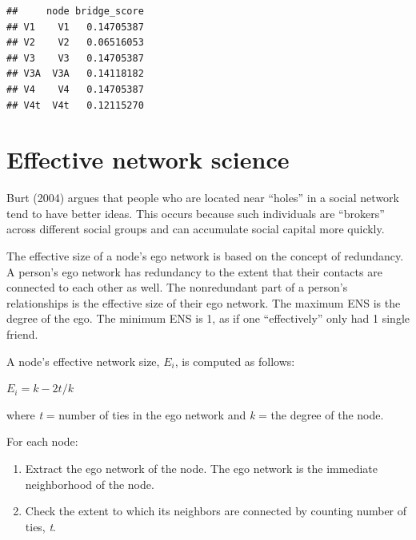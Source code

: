 \documentclass[
]{book}
\newenvironment{Shaded}{\begin{snugshade}}{\end{snugshade}}
\newcommand{\AttributeTok}[1]{\textcolor[rgb]{0.13,0.29,0.53}{#1}}
\newcommand{\FunctionTok}[1]{\textcolor[rgb]{0.13,0.29,0.53}{\textbf{#1}}}
\newcommand{\NormalTok}[1]{#1}
\newcommand{\OtherTok}[1]{\textcolor[rgb]{0.56,0.35,0.01}{#1}}
\newcommand{\SpecialCharTok}[1]{\textcolor[rgb]{0.81,0.36,0.00}{\textbf{#1}}}
\providecommand{\tightlist}{%
  \setlength{\itemsep}{0pt}\setlength{\parskip}{0pt}}
\begin{document}
\begin{Shaded}
\end{Shaded}

\begin{verbatim}
##     node bridge_score
## V1    V1   0.14705387
## V2    V2   0.06516053
## V3    V3   0.14705387
## V3A  V3A   0.14118182
## V4    V4   0.14705387
## V4t  V4t   0.12115270
\end{verbatim}

\section{Effective network science}\label{effective-network-science}

Burt (2004) argues that people who are located near ``holes'' in a social network tend to have better ideas. This occurs because such individuals are ``brokers'' across different social groups and can accumulate social capital more quickly.

The effective size of a node's ego network is based on the concept of redundancy. A person's ego network has redundancy to the extent that their contacts are connected to each other as well. The nonredundant part of a person's relationships is the effective size of their ego network. The maximum ENS is the degree of the ego. The minimum ENS is 1, as if one ``effectively'' only had 1 single friend.

A node's effective network size, \(E_i\), is computed as follows:

\(E_i=k−2t/k\)

where \emph{t} = number of ties in the ego network and \emph{k} = the degree of the node.

For each node:

\begin{enumerate}
\def\labelenumi{\arabic{enumi}.}
\tightlist
\item
  Extract the ego network of the node. The ego network is the immediate neighborhood of the node.
\item
  Check the extent to which its neighbors are connected by counting number of ties, \emph{t}.
\end{enumerate}
\end{document}

